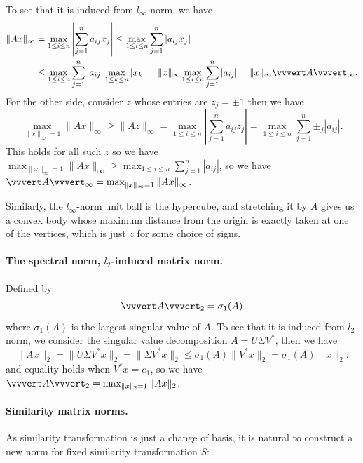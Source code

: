 \documentclass[../main.tex]{subfiles}
\begin{document}
To see that it is induced from $l_\infty$-norm, we have
\begin{equation*}
  \begin{aligned}
    \|A x\|_\infty & = \max_{1 \leq i \leq n} \left| \sum_{j=1}^n a_{ij} x_j \right| \leq \max_{1 \leq i \leq n} \sum_{j=1}^n |a_{ij} x_j| \\
    & \leq \max_{1 \leq i \leq n} \sum_{j=1}^n |a_{ij}| \max_{1 \leq k \leq n} |x_k| = \|x\|_\infty \max_{1 \leq i \leq n} \sum_{j=1}^n |a_{ij}| = \|x\|_\infty \vvvert A \vvvert_\infty.
  \end{aligned}
\end{equation*}
For the other side, consider $z$ whose entries are $z_j = \pm 1$ then we have
\begin{equation*}
  \max_{\|x\|_\infty = 1} \|A x\|_\infty \geq \|A z\|_\infty = \max_{1 \leq i \leq n} \left| \sum_{j=1}^n a_{ij} z_j \right| = \max_{1 \leq i \leq n} \sum_{j=1}^n \pm_j |a_{ij}|.
\end{equation*}
This holds for all such $z$ so we have $\max_{\|x\|_\infty = 1} \|A x\|_\infty \geq \max_{1 \leq i \leq n} \sum_{j=1}^n |a_{ij}|$, so we have $\vvvert A \vvvert_\infty = \max_{\|x\|_\infty = 1} \|A x\|_\infty$.

\begin{remark}
  Similarly, the $l_\infty$-norm unit ball is the hypercube, and stretching it by $A$ gives us a convex body whose maximum distance from the origin is exactly taken at one of the vertices, which is just $z$ for some choice of signs.
\end{remark}


\paragraph{The spectral norm, $l_2$-induced matrix norm. } Defined by
\begin{equation*}
  \vvvert A \vvvert_2 = \sigma_1(A)
\end{equation*}
where $\sigma_1(A)$ is the largest singular value of $A$. To see that it is induced from $l_2$-norm, we consider the singular value decomposition $A = U \Sigma V^*$, then we have
\begin{equation*}
  \|A x\|_2 = \|U \Sigma V^* x\|_2 = \|\Sigma V^* x\|_2 \leq \sigma_1(A) \|V^* x\|_2 = \sigma_1(A) \|x\|_2.
\end{equation*}
and equality holds when $V^* x = e_1$, so we have $\vvvert A \vvvert_2 = \max_{\|x\|_2 = 1} \|A x\|_2$.

\paragraph{Similarity matrix norms. } As similarity transformation is just a change of basis, it is natural to construct a new norm for fixed similarity transformation $S$:
\end{document}
